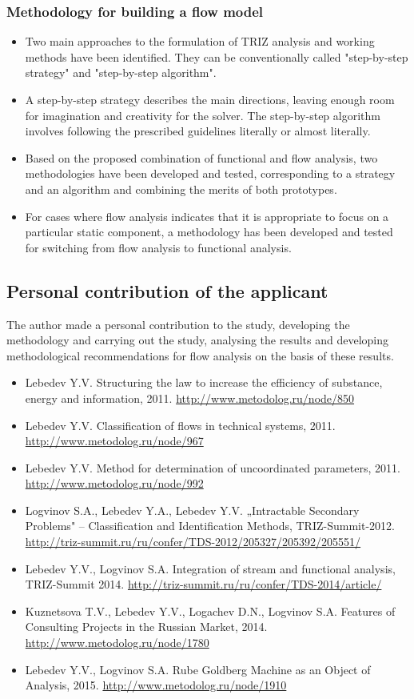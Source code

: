 \documentclass[a4paper,11pt]{article}
\begin{document}
\subsubsection{Methodology for building a flow model}
\begin{itemize}
\item Two main approaches to the formulation of TRIZ analysis and working
  methods have been identified. They can be conventionally called
  "step-by-step strategy" and "step-by-step algorithm".
\item A step-by-step strategy describes the main directions, leaving enough
  room for imagination and creativity for the solver. The step-by-step
  algorithm involves following the prescribed guidelines literally or almost
  literally.
\item Based on the proposed combination of functional and flow analysis, two
  methodologies have been developed and tested, corresponding to a strategy
  and an algorithm and combining the merits of both prototypes.
\item For cases where flow analysis indicates that it is appropriate to focus
  on a particular static component, a methodology has been developed and
  tested for switching from flow analysis to functional analysis.
\end{itemize}

\subsection{Personal contribution of the applicant}

The author made a personal contribution to the study, developing the
methodology and carrying out the study, analysing the results and developing
methodological recommendations for flow analysis on the basis of these
results.
\begin{itemize}
\item Lebedev Y.V. Structuring the law to increase the efficiency of
  substance, energy and information, 2011.
  \url{http://www.metodolog.ru/node/850}
\item Lebedev Y.V. Classification of flows in technical systems, 2011.
  \url{http://www.metodolog.ru/node/967}
\item Lebedev Y.V. Method for determination of uncoordinated parameters, 2011.
  \url{http://www.metodolog.ru/node/992}
\item Logvinov S.A., Lebedev Y.A., Lebedev Y.V. „Intractable Secondary
  Problems" -- Classification and Identification Methods, TRIZ-Summit-2012.
  \url{http://triz-summit.ru/ru/confer/TDS-2012/205327/205392/205551/}
\item Lebedev Y.V., Logvinov S.A. Integration of stream and functional
  analysis, TRIZ-Summit 2014.
  \url{http://triz-summit.ru/ru/confer/TDS-2014/article/}
\item Kuznetsova T.V., Lebedev Y.V., Logachev D.N., Logvinov S.A. Features of
  Consulting Projects in the Russian Market, 2014.
  \url{http://www.metodolog.ru/node/1780}
\item Lebedev Y.V., Logvinov S.A. Rube Goldberg Machine as an Object of
  Analysis, 2015.  \url{http://www.metodolog.ru/node/1910}
\end{itemize}
\end{document}

